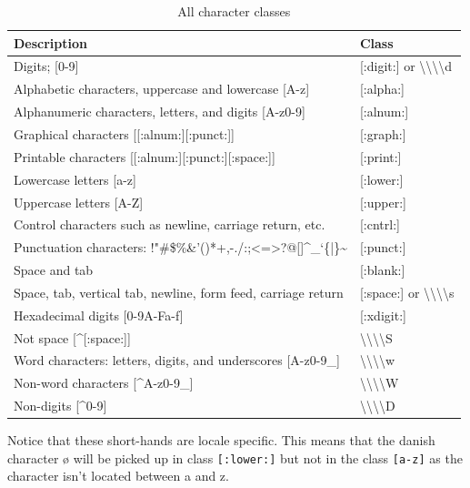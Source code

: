 \documentclass[
]{krantz}
\begin{document}
\begin{table}

\caption{\label{tab:characterclasses}All character classes}
\centering
\begin{tabular}[t]{ll}
\toprule
Description & Class\\
\midrule
Digits; [0-9] & [:digit:] or \textbackslash{}\textbackslash{}\textbackslash{}\textbackslash{}d\\
Alphabetic characters, uppercase and lowercase [A-z] & [:alpha:]\\
Alphanumeric characters, letters, and digits [A-z0-9] & [:alnum:]\\
Graphical characters [[:alnum:][:punct:]] & [:graph:]\\
Printable characters [[:alnum:][:punct:][:space:]] & [:print:]\\
\addlinespace
Lowercase letters [a-z] & [:lower:]\\
Uppercase letters [A-Z] & [:upper:]\\
Control characters such as newline, carriage return, etc. & [:cntrl:]\\
Punctuation characters: !"\#\$\%\&’()*+,-./:;<=>?@[]\textasciicircum{}\_`\{|\}\textasciitilde{} & [:punct:]\\
Space and tab & [:blank:]\\
\addlinespace
Space, tab, vertical tab, newline, form feed, carriage return & [:space:] or \textbackslash{}\textbackslash{}\textbackslash{}\textbackslash{}s\\
Hexadecimal digits [0-9A-Fa-f] & [:xdigit:]\\
Not space [\textasciicircum{}[:space:]] & \textbackslash{}\textbackslash{}\textbackslash{}\textbackslash{}S\\
Word characters:  letters, digits, and underscores [A-z0-9\_] & \textbackslash{}\textbackslash{}\textbackslash{}\textbackslash{}w\\
Non-word characters [\textasciicircum{}A-z0-9\_] & \textbackslash{}\textbackslash{}\textbackslash{}\textbackslash{}W\\
\addlinespace
Non-digits [\textasciicircum{}0-9] & \textbackslash{}\textbackslash{}\textbackslash{}\textbackslash{}D\\
\bottomrule
\end{tabular}
\end{table}

Notice that these short-hands are locale specific. This means that the danish character ø will be picked up in class \texttt{{[}:lower:{]}} but not in the class \texttt{{[}a-z{]}} as the character isn't located between a and z.
\end{document}
